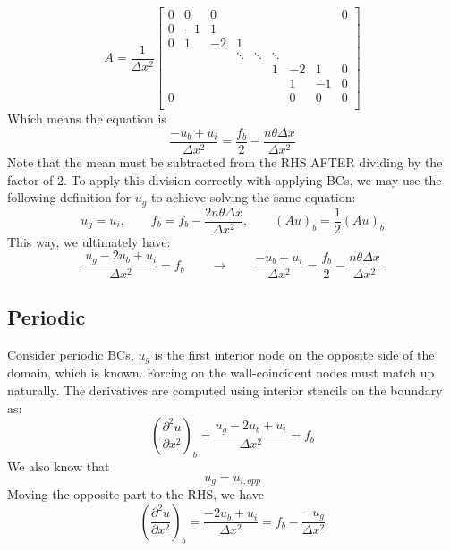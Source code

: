 \documentclass[landscape]{article}
\begin{document}
\[A = \frac{1}{\Delta x^2} \left[\begin{array}{ccccccccc}
0  & 0     & 0         &           &           &           &           &         &  0 \\
0  & -1    & 1         &           &           &           &           &         &    \\
0  & 1     & -2        & 1         &           &           &           &         &    \\
   &       &           & \ddots    & \ddots    & \ddots    &           &         &    \\
   &       &           &           &           & 1         & -2        & 1       &  0 \\
   &       &           &           &           &           &  1        & -1      &  0 \\
0  &       &           &           &           &           &  0        & 0       &  0 \\
\end{array} \right]
\]
Which means the equation is
\begin{equation}
   \frac{- u_b + u_i}{\Delta x^2} = \frac{f_b}{2}  - \frac{n\theta \Delta x}{\Delta x^2}
\end{equation}
Note that the mean must be subtracted from the RHS AFTER dividing by the factor of 2. To apply this division correctly with applying BCs, we may use the following definition for $u_g$ to achieve solving the same equation:
\begin{equation}
  \boxed{
  u_g = u_i, \qquad
  f_{b} = f_{b} - \frac{2n\theta \Delta x}{\Delta x^2}, \qquad
  (Au)_{b} = \frac{1}{2} (Au)_{b}
  }
\end{equation}
This way, we ultimately have:
\begin{equation}
   \frac{u_g - 2 u_b + u_i}{\Delta x^2} = f_b
   \qquad \rightarrow \qquad
   \frac{- u_b + u_i}{\Delta x^2} = \frac{f_b}{2} - \frac{n \theta \Delta x}{\Delta x^2}
\end{equation}


\subsection{Periodic}
Consider periodic BCs, $u_g$ is the first interior node on the opposite side of the domain, which is known. Forcing on the wall-coincident nodes must match up naturally. The derivatives are computed using interior stencils on the boundary as:
\begin{equation}
   \left(\frac{\partial^2 u}{\partial x^2}\right)_{b} =
   \frac{u_g - 2 u_b + u_{i}}{\Delta x^2} = f_b
\end{equation}
We also know that
\begin{equation}
  u_g = u_{i,opp}
\end{equation}
Moving the opposite part to the RHS, we have
\begin{equation}
   \left(\frac{\partial^2 u}{\partial x^2}\right)_{b} =
   \frac{- 2 u_b + u_{i}}{\Delta x^2} = f_b - \frac{- u_g}{\Delta x^2}
\end{equation}
\end{document}

